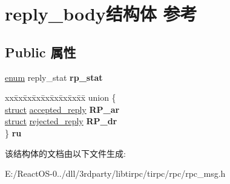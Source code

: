 \hypertarget{structreply__body}{}\section{reply\+\_\+body结构体 参考}
\label{structreply__body}
\subsection*{Public 属性}
\begin{DoxyCompactItemize}
\item 
\mbox{\label{structreply__body_aa90aa0ab3189e75234dd9d41981eaf78}} 
\hyperlink{interfaceenum}{enum} reply\+\_\+stat {\bfseries rp\+\_\+stat}
\item 
\mbox{\label{structreply__body_afe22730d4c3e1a775f5c728aa62daec9}} 
\begin{tabbing}
xx\=xx\=xx\=xx\=xx\=xx\=xx\=xx\=xx\=\kill
union \{\\
\>\hyperlink{interfacestruct}{struct} \hyperlink{structaccepted__reply}{accepted\_reply} {\bfseries RP\_ar}\\
\>\hyperlink{interfacestruct}{struct} \hyperlink{structrejected__reply}{rejected\_reply} {\bfseries RP\_dr}\\
\} {\bfseries ru}\\

\end{tabbing}\end{DoxyCompactItemize}


该结构体的文档由以下文件生成\+:\begin{DoxyCompactItemize}
\item 
E\+:/\+React\+O\+S-\/0../dll/3rdparty/libtirpc/tirpc/rpc/rpc\+\_\+msg.\+h\end{DoxyCompactItemize}
